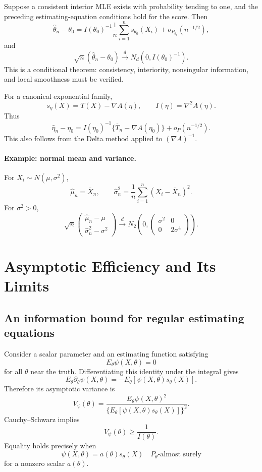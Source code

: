 Suppose a consistent interior MLE exists with probability tending
to one, and the preceding estimating-equation conditions hold for
the score. Then
\[
\widehat\theta_n-\theta_0
=
I(\theta_0)^{-1}
\frac1n\sum_{i=1}^ns_{\theta_0}(X_i)
+o_{P_{\theta_0}}(n^{-1/2}),
\]
and
\[
\sqrt n(\widehat\theta_n-\theta_0)
\xrightarrow{d}
N_d(0,I(\theta_0)^{-1}).
\]
This is a conditional theorem: consistency, interiority,
nonsingular information, and local smoothness must be verified.

For a canonical exponential family,
\[
s_\eta(X)=T(X)-\nabla A(\eta),
\qquad
I(\eta)=\nabla^2A(\eta).
\]
Thus
\[
\widehat\eta_n-\eta_0
=
I(\eta_0)^{-1}
\{\overline T_n-\nabla A(\eta_0)\}
+o_P(n^{-1/2}).
\]
This also follows from the Delta method applied to
$(\nabla A)^{-1}$.

\paragraph{Example: normal mean and variance.}
For $X_i\sim N(\mu,\sigma^2)$,
\[
\widehat\mu_n=\overline X_n,
\qquad
\widehat\sigma_n^2
=
\frac1n\sum_{i=1}^n(X_i-\overline X_n)^2.
\]
For $\sigma^2>0$,
\[
\sqrt n
\begin{pmatrix}
\widehat\mu_n-\mu\\
\widehat\sigma_n^2-\sigma^2
\end{pmatrix}
\xrightarrow{d}
N_2\left(
0,
\begin{pmatrix}
\sigma^2&0\\
0&2\sigma^4
\end{pmatrix}
\right).
\]

\section{Asymptotic Efficiency and Its Limits}

\subsection{An information bound for regular estimating equations}

Consider a scalar parameter and an estimating function satisfying
\[
E_\theta\psi(X,\theta)=0
\]
for all $\theta$ near the truth. Differentiating this identity under
the integral gives
\[
E_\theta\partial_\theta\psi(X,\theta)
=
-E_\theta[\psi(X,\theta)s_\theta(X)].
\]
Therefore its asymptotic variance is
\[
V_\psi(\theta)
=
\frac{E_\theta\psi(X,\theta)^2}
{\{E_\theta[\psi(X,\theta)s_\theta(X)]\}^2}.
\]
Cauchy--Schwarz implies
\[
V_\psi(\theta)\geq\frac1{I(\theta)}.
\]
Equality holds precisely when
\[
\psi(X,\theta)=a(\theta)s_\theta(X)
\quad P_\theta\text{-almost surely}
\]
for a nonzero scalar $a(\theta)$.

